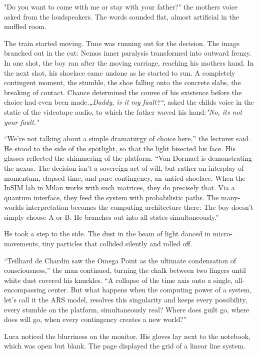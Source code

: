 \documentclass[
  ngerman,
]{article}
\begin{document}
"Do you want to come with me or stay with your father?" the
mother\textquotesingle s voice asked from the loudspeakers. The words
sounded flat, almost artificial in the muffled room.

The train started moving. Time was running out for the decision. The
image branched out in the cut: Nemo\textquotesingle s inner paralysis
transformed into outward frenzy. In one shot, the boy ran after the
moving carriage, reaching his mother\textquotesingle s hand. In the next
shot, his shoelace came undone as he started to run. A completely
contingent moment, the stumble, the shoe falling onto the concrete
slabs, the breaking of contact. Chance determined the course of his
existence before the choice had even been made.\emph{„Daddy, is it my
fault?{\kern0pt}``}, asked the child\textquotesingle s voice in the
static of the videotape audio, to which the father waved his
hand:\emph{"No, it\textquotesingle s not your fault."}

``We're not talking about a simple dramaturgy of choice here,'' the
lecturer said. He stood to the side of the spotlight, so that the light
bisected his face. His glasses reflected the shimmering of the platform.
``Van Dormael is demonstrating the nexus. The decision isn't a sovereign
act of will, but rather an interplay of momentum, elapsed time, and pure
contingency, an untied shoelace. When the InSIM lab in Milan works with
such matrices, they do precisely that. Via a quantum interface, they
feed the system with probabilistic paths. The many-worlds interpretation
becomes the computing architecture there: The boy doesn't simply choose
A or B. He branches out into all states simultaneously.''

He took a step to the side. The dust in the beam of light danced in
micro-movements, tiny particles that collided silently and rolled off.

``Teilhard de Chardin saw the Omega Point as the ultimate condensation
of consciousness,'' the man continued, turning the chalk between two
fingers until white dust covered his knuckles. ``A collapse of the time
axis onto a single, all-encompassing center. But what happens when the
computing power of a system, let's call it the ARS model, resolves this
singularity and keeps every possibility, every stumble on the platform,
simultaneously real? Where does guilt go, where does will go, when every
contingency creates a new world?''

Luca noticed the blurriness on the monitor. His gloves lay next to the
notebook, which was open but blank. The page displayed the grid of a
linear line system.
\end{document}
